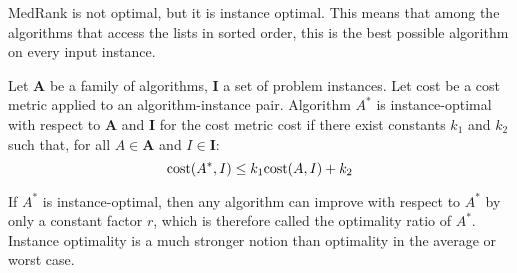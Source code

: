 MedRank is not optimal, but it is instance optimal. This means that among the algorithms that access the lists in sorted order, this is the best possible algorithm on every 
input instance. 
\begin{definition}
    Let $\boldsymbol{A}$ be a family of algorithms, $\boldsymbol{I}$ a set of problem instances. Let cost be a cost metric applied to an algorithm-instance pair. Algorithm 
    $A^{*}$ is instance-optimal with respect to $\boldsymbol{A}$ and $\boldsymbol{I}$ for the cost metric cost if there exist constants $k_1$ and $k_2$ such that, for all 
    $A \in \boldsymbol{A}$ and $I \in \boldsymbol{I}$: 
    \[\textnormal{cost}(A^{*}, I) \leq k_1 \textnormal{cost}(A, I) + k_2\]
\end{definition}
If $A^{*}$ is instance-optimal, then any algorithm can improve with respect to $A^{*}$ by only a constant factor $r$, which is therefore called the optimality ratio of $A^{*}$. 
Instance optimality is a much stronger notion than optimality in the average or worst case. 
